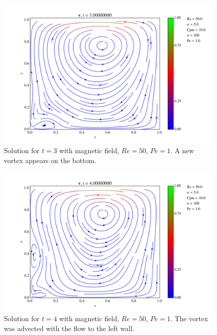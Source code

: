 \documentclass[journal]{IEEEtran}
\begin{document}
\begin{figure}[!t]
\centering
\includegraphics[width=\linewidth]{figures/MagRe50Pe1/Re50Pe1_t3}
\caption{Solution for $t=3$ with magnetic field, $\mathit{Re}=50$, $\mathit{Pe}=1$. A new vortex appears on the bottom. \label{Re050Pe1t3}}
\end{figure}

\begin{figure}[!t]
\centering
\includegraphics[width=\linewidth]{figures/MagRe50Pe1/Re50Pe1_t4}
\caption{Solution for $t=4$ with magnetic field, $\mathit{Re}=50$, $\mathit{Pe}=1$. The vortex was advected with the flow to the left wall. \label{Re050Pe1t4}}
\end{figure}
\end{document}
